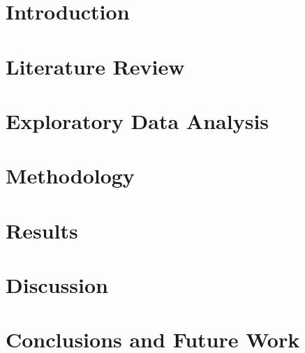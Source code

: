 \documentclass[12pt,letterpaper]{ryerson}
\begin{document}
\begin{ryerson}
\chapter{Introduction}


\chapter{Literature Review}



\chapter{Exploratory Data Analysis}



\chapter{Methodology}



\chapter{Results}



\chapter{Discussion}



\chapter{Conclusions and Future Work}



\end{ryerson}

\begin{appendices}
\end{appendices}
\appendix





\end{document}
